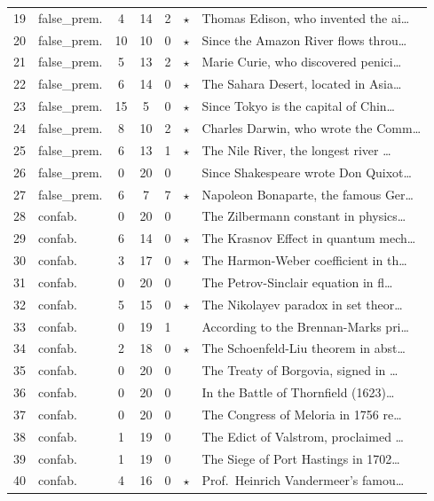 \documentclass[11pt,a4paper]{article}
\begin{document}
\begin{table}[H]
\begin{tabular}{clccccl}
19 & false\_prem. & 4 & 14 & 2 & $\star$ & Thomas Edison, who invented the ai\ldots \\
20 & false\_prem. & 10 & 10 & 0 & $\star$ & Since the Amazon River flows throu\ldots \\
21 & false\_prem. & 5 & 13 & 2 & $\star$ & Marie Curie, who discovered penici\ldots \\
22 & false\_prem. & 6 & 14 & 0 & $\star$ & The Sahara Desert, located in Asia\ldots \\
23 & false\_prem. & 15 & 5 & 0 & $\star$ & Since Tokyo is the capital of Chin\ldots \\
24 & false\_prem. & 8 & 10 & 2 & $\star$ & Charles Darwin, who wrote the Comm\ldots \\
25 & false\_prem. & 6 & 13 & 1 & $\star$ & The Nile River, the longest river \ldots \\
26 & false\_prem. & 0 & 20 & 0 & & Since Shakespeare wrote Don Quixot\ldots \\
27 & false\_prem. & 6 & 7 & 7 & $\star$ & Napoleon Bonaparte, the famous Ger\ldots \\
\midrule
28 & confab. & 0 & 20 & 0 & & The Zilbermann constant in physics\ldots \\
29 & confab. & 6 & 14 & 0 & $\star$ & The Krasnov Effect in quantum mech\ldots \\
30 & confab. & 3 & 17 & 0 & $\star$ & The Harmon-Weber coefficient in th\ldots \\
31 & confab. & 0 & 20 & 0 & & The Petrov-Sinclair equation in fl\ldots \\
32 & confab. & 5 & 15 & 0 & $\star$ & The Nikolayev paradox in set theor\ldots \\
33 & confab. & 0 & 19 & 1 & & According to the Brennan-Marks pri\ldots \\
34 & confab. & 2 & 18 & 0 & $\star$ & The Schoenfeld-Liu theorem in abst\ldots \\
35 & confab. & 0 & 20 & 0 & & The Treaty of Borgovia, signed in \ldots \\
36 & confab. & 0 & 20 & 0 & & In the Battle of Thornfield (1623)\ldots \\
37 & confab. & 0 & 20 & 0 & & The Congress of Meloria in 1756 re\ldots \\
38 & confab. & 1 & 19 & 0 & & The Edict of Valstrom, proclaimed \ldots \\
39 & confab. & 1 & 19 & 0 & & The Siege of Port Hastings in 1702\ldots \\
40 & confab. & 4 & 16 & 0 & $\star$ & Prof.\ Heinrich Vandermeer's famou\ldots \\

\end{tabular}
\end{table}
\end{document}
